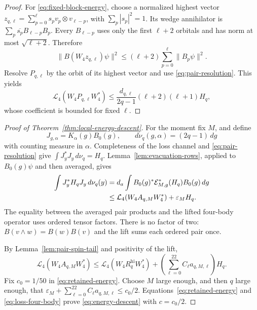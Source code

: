 \begin{proof}
For \eqref{eq:fixed-block-energy}, choose a normalized highest vector
$z_{q,\ell}=\sum_{p=0}^{\ell}s_pv_p\otimes v_{\ell-p}$, with
$\sum_p|s_p|^2=1$.  Its wedge annihilator is
$\sum_p\overline{s_p}B_{\ell-p}B_p$.
Every $B_{\ell-p}$ uses only the first $\ell+2$ orbitals and has norm at
most $\sqrt{\ell+2}$.  Therefore
\[
 \|B(W_4z_{q,\ell})\psi\|^2
 \le(\ell+2)\sum_{p=0}^{\ell}\|B_p\psi\|^2.
\]
Resolve $P_{q,\ell}$ by the orbit of its highest vector and use
\eqref{eq:pair-resolution}.  This yields
\[
 \mathcal L_4(W_4P_{q,\ell}W_4^*)
 \le\frac{d_{q,\ell}}{2q-1}(\ell+2)(\ell+1)H_q,
\]
whose coefficient is bounded for fixed $\ell$.
\end{proof}

\begin{proof}[Proof of Theorem~\ref{thm:local-energy-descent}]
For the moment fix $M$, and define
\[
 J_{g,\alpha}=K_\alpha(g)B_0(g),
 \qquad d\nu_q(g,\alpha)=(2q-1)\,dg
\]
with counting measure in $\alpha$.
Completeness of the loss channel and \eqref{eq:pair-resolution} give
$\int J_y^*J_y\,d\nu_q=H_q$.
Lemma~\ref{lem:evacuation-rows}, applied to $B_0(g)\psi$ and then averaged,
gives
\begin{align}
 \int J_y^*H_qJ_y\,d\nu_q(y)
 &=d_a\int B_0(g)^*\mathcal E_{M,g}^*(H_q)B_0(g)\,dg\notag\\
 &\le\mathcal L_4(W_4A_{q,M}W_4^*)+\varepsilon_MH_q.
 \label{eq:loss-four-body}
\end{align}
The equality between the averaged pair products and the lifted four-body
operator uses ordered tensor factors.  There is no factor of two:
$B(v\wedge w)=B(w)B(v)$ and the lift sums each ordered pair once.

By Lemma~\ref{lem:pair-spin-tail} and positivity of the lift,
\[
 \mathcal L_4(W_4A_{q,M}W_4^*)
 \le\mathcal L_4(W_4R_q^{\mathrm{hi}}W_4^*)
       +\left(\sum_{\ell=0}^{22}C_\ell a_{q,M,\ell}\right)H_q.
\]
Fix $c_0=1/50$ in \eqref{eq:retained-energy}.  Choose $M$ large enough,
and then $q$ large enough, that
$\varepsilon_M+\sum_{\ell=0}^{22}C_\ell a_{q,M,\ell}\le c_0/2$.
Equations~\eqref{eq:retained-energy} and \eqref{eq:loss-four-body} prove
\eqref{eq:energy-descent} with $c=c_0/2$.


\end{proof}
